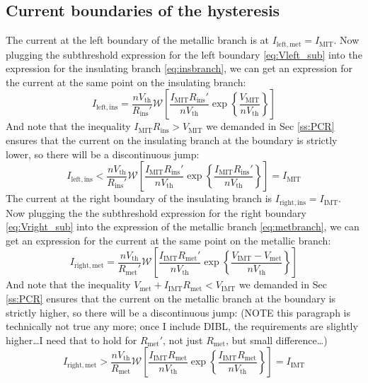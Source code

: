 \documentclass[letterpaper]{article}
\newcommand{\Vth}{\ensuremath{V_\mathrm{th}}}
\newcommand{\IMIT}{\ensuremath{I_\mathrm{MIT}}}
\newcommand{\IIMT}{\ensuremath{I_\mathrm{IMT}}}
\newcommand{\Rins}{\ensuremath{R_\mathrm{ins}}}
\newcommand{\Rmet}{\ensuremath{R_\mathrm{met}}}
\newcommand{\Rinsp}{\ensuremath{R_\mathrm{ins}'}}
\newcommand{\Rmetp}{\ensuremath{R_\mathrm{met}'}}
\begin{document}
\subsection{Current boundaries of the hysteresis}
The current at the left boundary of the metallic branch is at $I_\mathrm{left, met}=\IMIT $.  Now plugging  the subthreshold expression for the left boundary \eqref{eq:Vleft_sub} into the expression for the insulating branch \eqref{eq:insbranch}, we can get an expression for the current at the same point on the insulating branch:
\begin{equation}
I_\mathrm{left,ins}=\frac{n\Vth }{\Rinsp}\mathcal{W}\left[\frac{\IMIT \Rinsp}{n\Vth }\exp\left\{\frac{V_\mathrm{MIT}}{n\Vth }\right\}\right]
\label{eq:Ileftins}
\end{equation}
And note that the inequality $\IMIT \Rins >V_\mathrm{MIT}$ we demanded in Sec \ref{ss:PCR} ensures that the current on the insulating branch at the boundary is strictly lower, so there will be a discontinuous jump:
\begin{equation}
I_\mathrm{left, ins}<\frac{n\Vth }{\Rinsp}\mathcal{W}\left[\frac{\IMIT \Rinsp}{n\Vth }\exp\left\{\frac{\IMIT \Rinsp }{n\Vth }\right\}\right]=\IMIT 
  \label{eq:leftjump}
\end{equation}
The current at the right boundary of the insulating branch is $I_\mathrm{right, ins}=\IIMT $.  Now plugging the the subthreshold expression for the right boundary \eqref{eq:Vright_sub} into the expression of the metallic branch \eqref{eq:metbranch}, we can get an expression for the current at the same point on the metallic branch:
\begin{equation}
  I_\mathrm{right,met}=\frac{n\Vth }{\Rmetp}\mathcal{W}\left[\frac{\IIMT \Rmetp}{n\Vth }\exp\left\{\frac{V_\mathrm{IMT}-V_\mathrm{met}}{n\Vth }\right\}\right]
\label{eq:Irightmet}
\end{equation}
And note that the inequality $V_\mathrm{met}+\IIMT\Rmet <V_\mathrm{IMT}$ we demanded in Sec \ref{ss:PCR} ensures that the current on the metallic branch at the boundary is strictly higher, so there will be a discontinuous jump:
  (NOTE this paragraph is technically not true any more; once I include DIBL, the requirements are slightly higher\dots I need that to hold for $\Rmetp$, not just $\Rmet$, but small difference\dots)
\begin{equation}
  I_\mathrm{right,met}>\frac{n\Vth }{\Rmet }\mathcal{W}\left[\frac{\IIMT \Rmet }{n\Vth }\exp\left\{\frac{\IIMT \Rmet }{n\Vth }\right\}\right]=\IIMT 
  \label{eq:rightjump}
\end{equation}
\end{document}
